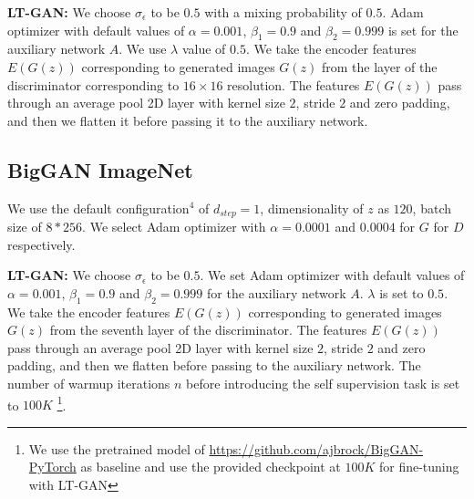 \documentclass[10pt,twocolumn,letterpaper]{article}
\begin{document}
\textbf{LT-GAN:}
We choose $\sigma_\epsilon$ to be $0.5$ with a mixing probability of $0.5$. Adam optimizer with default values of $\alpha=0.001$, $\beta_1=0.9$ and $\beta_2=0.999$ is set for the auxiliary network $A$. We use $\lambda$ value of $0.5$. We take the encoder features $E(G(z))$ corresponding to generated images $G(z)$ from the layer of the discriminator corresponding to $16\times16$ resolution. The features $E(G(z))$ pass through an average pool 2D layer with kernel size $2$, stride $2$ and zero padding, and then we flatten it before passing it to the auxiliary network. 



\subsection{BigGAN ImageNet}
We use the default configuration$^4$ of $d_{step} = 1$, dimensionality of $z$ as $120$, batch size of $8*256$. We select Adam optimizer with $\alpha=0.0001$ and $0.0004$ for $G$ for $D$ respectively. 

\textbf{LT-GAN:}
We choose $\sigma_\epsilon$ to be $0.5$. We set Adam optimizer with default values of $\alpha=0.001$, $\beta_1=0.9$ and $\beta_2=0.999$ for the auxiliary network $A$. $\lambda$ is set to $0.5$. We take the encoder features $E(G(z))$ corresponding to generated images $G(z)$ from the seventh layer of the discriminator. The features $E(G(z))$ pass through an average pool 2D layer with kernel size $2$, stride $2$ and zero padding, and then we flatten before passing to the auxiliary network. The number of warmup iterations $n$ before introducing the self supervision task is set to $100K$ \footnote{We use the pretrained model of \url{https://github.com/ajbrock/BigGAN-PyTorch} as baseline and use the provided checkpoint at $100K$ for fine-tuning with LT-GAN}.
\end{document}
